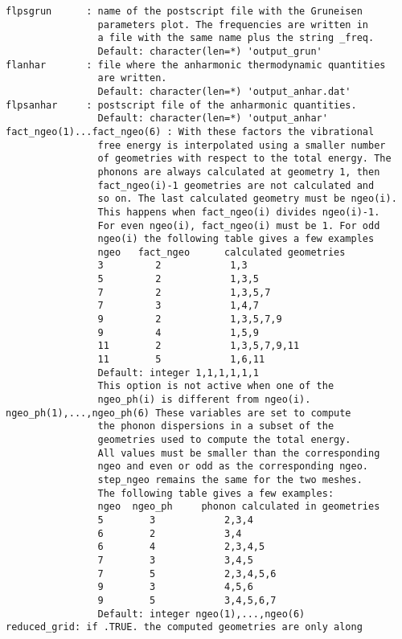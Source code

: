\documentclass[12pt,a4paper,twoside]{report}
\begin{document}
\begin{verbatim}
flpsgrun      : name of the postscript file with the Gruneisen 
                parameters plot. The frequencies are written in 
                a file with the same name plus the string _freq.
                Default: character(len=*) 'output_grun'
flanhar       : file where the anharmonic thermodynamic quantities 
                are written.
                Default: character(len=*) 'output_anhar.dat'
flpsanhar     : postscript file of the anharmonic quantities.
                Default: character(len=*) 'output_anhar'
fact_ngeo(1)...fact_ngeo(6) : With these factors the vibrational 
                free energy is interpolated using a smaller number 
                of geometries with respect to the total energy. The 
                phonons are always calculated at geometry 1, then 
                fact_ngeo(i)-1 geometries are not calculated and 
                so on. The last calculated geometry must be ngeo(i). 
                This happens when fact_ngeo(i) divides ngeo(i)-1. 
                For even ngeo(i), fact_ngeo(i) must be 1. For odd 
                ngeo(i) the following table gives a few examples
                ngeo   fact_ngeo      calculated geometries
                3         2            1,3
                5         2            1,3,5
                7         2            1,3,5,7
                7         3            1,4,7
                9         2            1,3,5,7,9
                9         4            1,5,9
                11        2            1,3,5,7,9,11
                11        5            1,6,11
                Default: integer 1,1,1,1,1,1
                This option is not active when one of the 
                ngeo_ph(i) is different from ngeo(i).
ngeo_ph(1),...,ngeo_ph(6) These variables are set to compute 
                the phonon dispersions in a subset of the 
                geometries used to compute the total energy. 
                All values must be smaller than the corresponding 
                ngeo and even or odd as the corresponding ngeo. 
                step_ngeo remains the same for the two meshes.
                The following table gives a few examples:
                ngeo  ngeo_ph     phonon calculated in geometries
                5        3            2,3,4
                6        2            3,4
                6        4            2,3,4,5
                7        3            3,4,5
                7        5            2,3,4,5,6
                9        3            4,5,6
                9        5            3,4,5,6,7
                Default: integer ngeo(1),...,ngeo(6)
reduced_grid: if .TRUE. the computed geometries are only along 

\end{verbatim}
\end{document}
